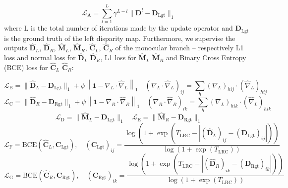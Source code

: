 \small\begin{equation}
    \mathcal{L}_\text{A} = \sum_{l=1}^L{\gamma^{L-l}\lVert \mathbf{D}^l-\mathbf{D}_\text{Lgt} \rVert_1}
    \label{eq:loss_raft}
\end{equation}\normalsize
where L is the total number of iterations made by the update operator and $\mathbf{D}_\text{Lgt}$ is the ground truth of the left disparity map.
Furthermore, we supervise the outputs $\hat{\mathbf{D}}_L$, $\hat{\mathbf{D}}_R$, $\hat{\mathbf{M}}_L$, $\hat{\mathbf{M}}_R$, $\hat{\mathbf{C}}_L$, $\hat{\mathbf{C}}_R$ of the monocular branch -- respectively L1 loss and normal loss for $\hat{\mathbf{D}}_L$ $\hat{\mathbf{D}}_R$, L1 loss for $\hat{\mathbf{M}}_L$ $\hat{\mathbf{M}}_R$ and Binary Cross Entropy (BCE) loss for $\hat{\mathbf{C}}_L$ $\hat{\mathbf{C}}_R$:

\small\begin{equation}
    \mathcal{L}_\text{B} = \lVert \hat{\mathbf{D}}_L - \mathbf{D}_\text{Lgt} \rVert_1 + \psi \left\lVert \mathbf{1} - \nabla_L\cdot\hat{\nabla}_L \right\rVert_1 \quad \left( \nabla_L\cdot\hat{\nabla}_L \right)_{ij} = \sum_h (\nabla_L)_{hij} \cdot (\hat{\nabla}_L)_{hij}
    \label{eq:loss_coarse_disp_left}
\end{equation}\normalsize
\small\begin{equation}
    \mathcal{L}_\text{C} = \lVert \hat{\mathbf{D}}_R - \mathbf{D}_\text{Rgt} \rVert_1 + \psi \left\lVert \mathbf{1} - \nabla_R\cdot\hat{\nabla}_R \right\rVert_1 \quad \left( \nabla_R\cdot\hat{\nabla}_R \right)_{ik} = \sum_h (\nabla_L)_{hik} \cdot (\hat{\nabla}_L)_{hik}
    \label{eq:loss_coarse_disp_right}
\end{equation}\normalsize
\small\begin{equation}
    \mathcal{L}_\text{D} = \lVert \hat{\mathbf{M}}_L - \mathbf{D}_\text{Lgt} \rVert_1  \quad \mathcal{L}_\text{E} = \lVert \hat{\mathbf{M}}_R - \mathbf{D}_\text{Rgt} \rVert_1 
    \label{eq:loss_scaled_disp}
\end{equation}\normalsize
\small\begin{equation}
    \mathcal{L}_\text{F} = \text{BCE}(\hat{\mathbf{C}}_L,\mathbf{C}_\text{Lgt}), \quad (\mathbf{C}_\text{Lgt})_{ij} = \frac{\log\left(1+\exp\left(T_\text{LRC}-\left| (\hat{\mathbf{D}}_L)_{ij} - (\mathbf{D}_\text{Lgt})_{ij}  \right|\right)\right)}{\log(1+\exp(T_\text{LRC}))}
    \label{eq:loss_coarse_conf_left}
\end{equation}\normalsize
\small\begin{equation}
    \mathcal{L}_\text{G} = \text{BCE}(\hat{\mathbf{C}}_R,\mathbf{C}_\text{Rgt}), \quad (\mathbf{C}_\text{Rgt})_{ik} = \frac{\log\left(1+\exp\left(T_\text{LRC}-\left| (\hat{\mathbf{D}}_R)_{ik} - (\mathbf{D}_\text{Rgt})_{ik}  \right|\right)\right)}{\log(1+\exp(T_\text{LRC}))}
    \label{eq:loss_coarse_conf_right}
\end{equation}\normalsize
